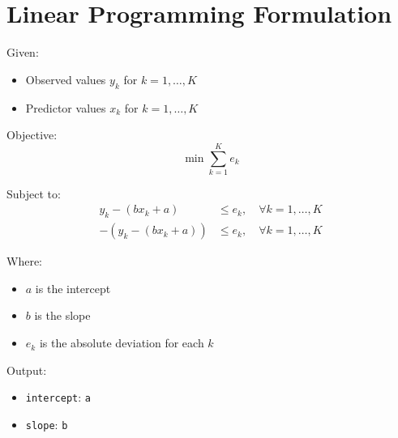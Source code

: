 \documentclass{article}
\begin{document}
\section*{Linear Programming Formulation}

Given:
\begin{itemize}
    \item Observed values \( y_k \) for \( k = 1, \ldots, K \)
    \item Predictor values \( x_k \) for \( k = 1, \ldots, K \)
\end{itemize}

Objective:
\[
\min \sum_{k=1}^{K} e_k
\]

Subject to:
\begin{align*}
    y_k - (bx_k + a) & \leq e_k, \quad \forall k = 1, \ldots, K \\
    -(y_k - (bx_k + a)) & \leq e_k, \quad \forall k = 1, \ldots, K
\end{align*}

Where:
\begin{itemize}
    \item \( a \) is the intercept
    \item \( b \) is the slope
    \item \( e_k \) is the absolute deviation for each \( k \)
\end{itemize}

Output:
\begin{itemize}
    \item \texttt{intercept}: \texttt{a}
    \item \texttt{slope}: \texttt{b}
\end{itemize}
\end{document}
